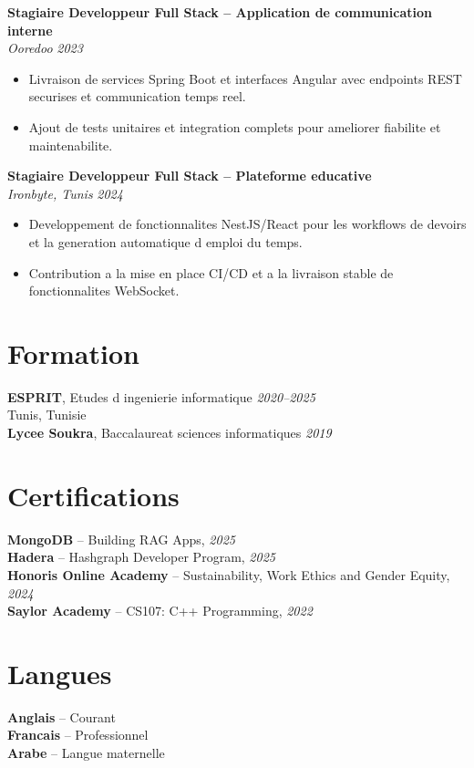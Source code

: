 \documentclass[10pt,a4paper]{article}
\begin{document}
{\vspace{2pt}
\textbf{Stagiaire Developpeur Full Stack -- Application de communication interne}\\[1pt]
\textit{Ooredoo} \hfill \textit{2023}
\begin{itemize}
  \item Livraison de services Spring Boot et interfaces Angular avec endpoints REST securises et communication temps reel.
  \item Ajout de tests unitaires et integration complets pour ameliorer fiabilite et maintenabilite.
\end{itemize}

\vspace{2pt}
\textbf{Stagiaire Developpeur Full Stack -- Plateforme educative}\\[1pt]
\textit{Ironbyte, Tunis} \hfill \textit{2024}
\begin{itemize}
  \item Developpement de fonctionnalites NestJS/React pour les workflows de devoirs et la generation automatique d emploi du temps.
  \item Contribution a la mise en place CI/CD et a la livraison stable de fonctionnalites WebSocket.
\end{itemize}

}

\vspace{2pt}
\section*{Formation}
{\small
\textbf{ESPRIT}, Etudes d ingenierie informatique \hfill \textit{2020--2025}\\[1pt]
Tunis, Tunisie\\[2pt]
\textbf{Lycee Soukra}, Baccalaureat sciences informatiques \hfill \textit{2019}
}

\vspace{2pt}
\section*{Certifications}
{\small
\textbf{MongoDB} -- Building RAG Apps, \textit{2025}\\[1pt]
\textbf{Hadera} -- Hashgraph Developer Program, \textit{2025}\\[1pt]
\textbf{Honoris Online Academy} -- Sustainability, Work Ethics and Gender Equity, \textit{2024}\\[1pt]
\textbf{Saylor Academy} -- CS107: C++ Programming, \textit{2022}
}

\section*{Langues}
{\small
\textbf{Anglais} -- Courant\\[1pt]
\textbf{Francais} -- Professionnel\\[1pt]
\textbf{Arabe} -- Langue maternelle
}
\end{document}

